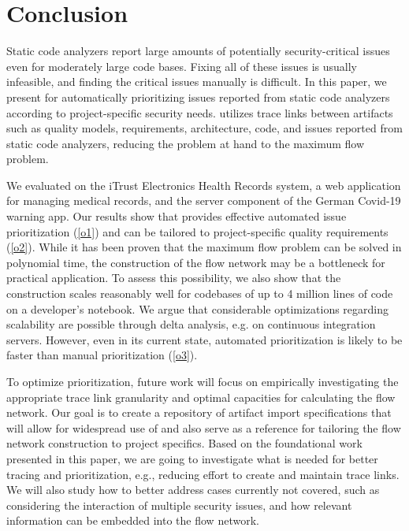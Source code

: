 \section{Conclusion}
\label{sec:conslusion}
Static code analyzers report large amounts of potentially security-critical issues even for moderately large code bases.
Fixing all of these issues is usually infeasible, and finding the critical issues manually is difficult.
In this paper, we present \appr{} for automatically prioritizing issues reported from static code analyzers according to project-specific security needs.
\appr{} utilizes trace links between artifacts such as quality models, requirements, architecture, code, and issues reported from static code analyzers, reducing the problem at hand to the maximum flow problem.

We evaluated \appr{} on the iTrust Electronics Health Records system, a web application for managing medical records, and the server component of the German Covid-19 warning app.
Our results show that \appr{} provides effective automated issue prioritization (\ref{o1}) and can be tailored to project-specific quality requirements (\ref{o2}).
While it has been proven that the maximum flow problem can be solved in polynomial time, the construction of the flow network may be a bottleneck for practical application.
To assess this possibility, we also show that the construction scales reasonably well for codebases of up to 4 million lines of code on a developer's notebook.
We argue that considerable optimizations regarding scalability are possible through delta analysis, e.g. on continuous integration servers.
However, even in its current state,  automated prioritization is likely to be faster than manual prioritization (\ref{o3}).

To optimize prioritization, future work will focus on empirically investigating the appropriate trace link granularity and optimal capacities for calculating the flow network.
Our goal is to create a repository of artifact import specifications that will allow for widespread use of \appr{} and also serve as a reference for tailoring the flow network construction to project specifics.
Based on the foundational work presented in this paper, we are going to investigate what is needed for better tracing and prioritization, e.g., reducing effort to create and maintain trace links.
We will also study how to better address cases currently not covered, such as considering the interaction of multiple security issues, and how relevant information can be embedded into the flow network.


